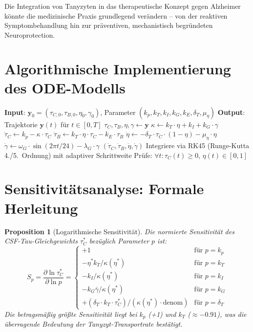 ﻿\documentclass[12pt,a4paper]{article}
\newtheorem{proposition}[theorem]{Proposition}
\theoremstyle{definition}
\begin{document}
	Die Integration von Tanyzyten in das therapeutische Konzept gegen Alzheimer könnte die medizinische Praxis grundlegend verändern -- von der reaktiven Symptombehandlung hin zur präventiven, mechanistisch begründeten Neuroprotection.
	
	\appendix
	\section{Algorithmische Implementierung des ODE-Modells}
	
	\begin{algorithm}[H]
		\caption{Tau-Clearance ODE-Simulation (Pseudocode)}
		\label{alg:ode_sim}
		\begin{algorithmic}[1]
			\State \textbf{Input}: $\mathbf{y}_0 = (\tau_{C,0}, \tau_{B,0}, \eta_0, \gamma_0)$, Parameter $(k_p, k_T, k_I, k_G, k_E, \delta_T, \mu_\eta)$
			\State \textbf{Output}: Trajektorie $\mathbf{y}(t)$ für $t \in [0, T]$
			\State $\tau_C, \tau_B, \eta, \gamma \gets \mathbf{y}$
			\State $\kappa \gets k_T\cdot\eta + k_I + k_G\cdot\gamma$
			\State $\dot{\tau}_C \gets k_p - \kappa\cdot\tau_C$
			\State $\dot{\tau}_B \gets k_T\cdot\eta\cdot\tau_C - k_E\cdot\tau_B$
			\State $\dot{\eta} \gets -\delta_T\cdot\tau_C\cdot(1-\eta) - \mu_\eta\cdot\eta$
			\State $\dot{\gamma} \gets \omega_G\cdot\sin(2\pi t / 24) - \lambda_G\cdot\gamma$
			\Return $(\dot{\tau}_C, \dot{\tau}_B, \dot{\eta}, \dot{\gamma})$
			\EndFunction
			\State Integriere via \textsc{RK45} (Runge-Kutta 4./5.\ Ordnung) mit adaptiver Schrittweite
			\State Prüfe: $\forall t: \tau_C(t) \geq 0$, $\eta(t) \in [0,1]$
		\end{algorithmic}
	\end{algorithm}
	
	\section{Sensitivitätsanalyse: Formale Herleitung}
	
	\begin{proposition}[Logarithmische Sensitivität]
		Die normierte Sensitivität des CSF-Tau-Gleichgewichts $\tau_C^*$ bezüglich Parameter $p$ ist:
		\[
		S_p = \frac{\partial \ln \tau_C^*}{\partial \ln p} = \begin{cases}
			+1 & \text{für } p = k_p \\
			-\eta^* k_T / \kappa(\eta^*) & \text{für } p = k_T \\
			-k_I / \kappa(\eta^*) & \text{für } p = k_I \\
			-k_G\bar{\gamma} / \kappa(\eta^*) & \text{für } p = k_G \\
			+(\delta_T \cdot k_T \cdot \tau_C^*) / (\kappa(\eta^*)\cdot\text{denom}) & \text{für } p = \delta_T
		\end{cases}
		\]
		Die betragsmäßig größte Sensitivität liegt bei $k_p$ (+1) und $k_T$ ($\approx -0.91$), was die überragende Bedeutung der Tanyzyt-Transportrate bestätigt.
	\end{proposition}
	
\end{document}
